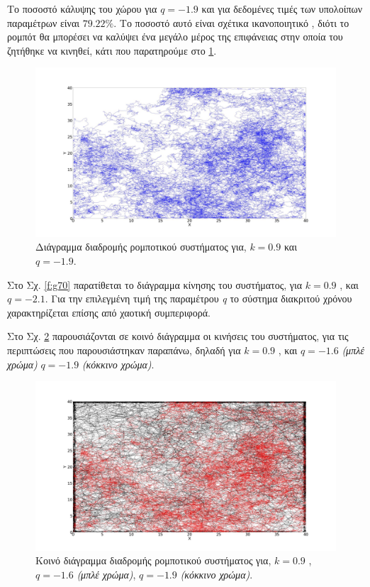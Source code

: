 Το ποσοστό κάλυψης του χώρου για $q = -1.9$ και για δεδομένες τιμές των υπολοίπων παραμέτρων είναι $79.22 \%$. Το ποσοστό αυτό είναι σχέτικα ικανοποιητικό , διότι το ρομπότ θα μπορέσει να καλύψει ένα μεγάλο μέρος της επιφάνειας στην οποία του ζητήθηκε να κινηθεί, κάτι που παρατηρούμε στο \ref{f:g69}.


\begin{figure}[ht]
	\centering
	\includegraphics[width=1\linewidth]{LateX images/log/q/g1-1.9}
	\caption{Διάγραμμα διαδρομής ρομποτικού συστήματος για, $k = 0.9$ και $q = -1.9$.}
	\label{f:g69}	
\end{figure}


Στο Σχ. \ref{f:g70} παρατίθεται το διάγραμμα κίνησης του συστήματος, για $k=0.9$ , και $q = -2.1$. Για την επιλεγμένη τιμή της παραμέτρου \emph{q} το σύστημα διακριτού χρόνου χαρακτηρίζεται επίσης από χαοτική συμπεριφορά.


Στο Σχ. \ref{f:g71} παρουσιάζονται σε κοινό διάγραμμα οι κινήσεις του συστήματος, για τις
περιπτώσεις που παρουσιάστηκαν παραπάνω, δηλαδή για $k=0.9$ , και $q = -1.6$ \emph{(μπλέ χρώμα)}
$q = -1.9$ \emph{(κόκκινο χρώμα)}.

\begin{figure}[ht]
	\centering
	\includegraphics[width=1\linewidth]{LateX images/log/q/g1}
	\caption{Κοινό διάγραμμα διαδρομής ρομποτικού συστήματος για, $k = 0.9$ , $q = -1.6$ \emph{(μπλέ χρώμα)}, $q = -1.9$ \emph{(κόκκινο χρώμα)}.}
	\label{f:g71}	
\end{figure}

